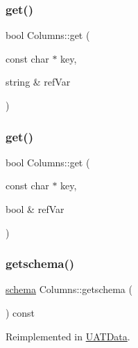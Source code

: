 \mbox{\label{classColumns_a4cb8a06d153469b71aa4de37968d6277}} 
\subsubsection{\texorpdfstring{get()}{get()}\hspace{0.1cm}{\footnotesize\ttfamily [3/4]}}
{\footnotesize\ttfamily bool Columns\+::get (\begin{DoxyParamCaption}\item[{const char $\ast$}]{key,  }\item[{string \&}]{ref\+Var }\end{DoxyParamCaption})}

\mbox{\label{classColumns_adf2ef04de02351dcbb3ab7e1fed5a7fe}} 
\subsubsection{\texorpdfstring{get()}{get()}\hspace{0.1cm}{\footnotesize\ttfamily [4/4]}}
{\footnotesize\ttfamily bool Columns\+::get (\begin{DoxyParamCaption}\item[{const char $\ast$}]{key,  }\item[{bool \&}]{ref\+Var }\end{DoxyParamCaption})}

\mbox{\label{classColumns_aeb2cbb10de5358d5c1f411f327324c94}} 
\subsubsection{\texorpdfstring{getschema()}{getschema()}}
{\footnotesize\ttfamily \mbox{\hyperlink{datadefinition_8h_aec40b8d2d2c045d8af617ce94864651f}{schema}} Columns\+::getschema (\begin{DoxyParamCaption}{ }\end{DoxyParamCaption}) const\hspace{0.3cm}{\ttfamily [virtual]}}



Reimplemented in \mbox{\hyperlink{classUATData_a33290ef354a04c15d5262ccc7500411b}{U\+A\+T\+Data}}.

